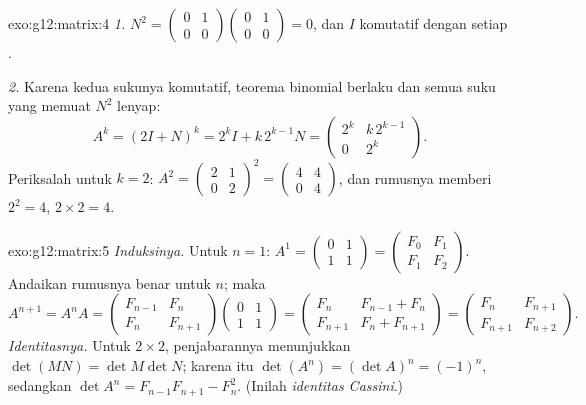 \begin{solution}{exo:g12:matrix:4}
\emph{1.} $N^2 = \begin{pmatrix} 0&1\\0&0\end{pmatrix}
\begin{pmatrix} 0&1\\0&0\end{pmatrix} = 0$, dan $I$ komutatif dengan setiap
.

\emph{2.} Karena kedua sukunya komutatif, teorema binomial berlaku dan semua
suku yang memuat $N^2$ lenyap:
\[
A^k = (2I + N)^k = 2^k I + k\,2^{k-1} N
= \begin{pmatrix} 2^k & k\,2^{k-1}\\ 0 & 2^k \end{pmatrix}.
\]
Periksalah untuk $k = 2$:
$A^2 = \begin{pmatrix} 2&1\\0&2\end{pmatrix}^2
= \begin{pmatrix} 4&4\\0&4\end{pmatrix}$, dan rumusnya memberi
$2^2 = 4$, $2 \times 2 = 4$. \checkmark
\end{solution}

\begin{solution}{exo:g12:matrix:5}
\emph{Induksinya.} Untuk $n = 1$:
$A^1 = \begin{pmatrix} 0&1\\1&1\end{pmatrix}
= \begin{pmatrix} F_0 & F_1\\ F_1 & F_2\end{pmatrix}$. Andaikan rumusnya benar
untuk $n$; maka
\[
A^{n+1} = A^n A
= \begin{pmatrix} F_{n-1} & F_n\\ F_n & F_{n+1}\end{pmatrix}
\begin{pmatrix} 0 & 1\\ 1 & 1\end{pmatrix}
= \begin{pmatrix} F_n & F_{n-1} + F_n\\ F_{n+1} & F_n + F_{n+1}\end{pmatrix}
= \begin{pmatrix} F_n & F_{n+1}\\ F_{n+1} & F_{n+2}\end{pmatrix}.
\]
\emph{Identitasnya.} Untuk  $2\times2$, penjabarannya menunjukkan
$\det(MN) = \det M \det N$; karena itu
$\det(A^n) = (\det A)^n = (-1)^n$, sedangkan
$\det A^n = F_{n-1}F_{n+1} - F_n^2$. (Inilah \emph{identitas Cassini}.)
\end{solution}

